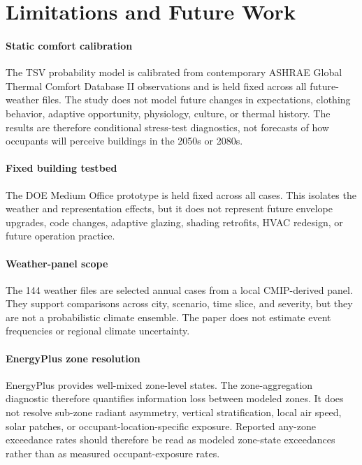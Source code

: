 \section{Limitations and Future Work}\label{sec:limitations}

\paragraph{Static comfort calibration}
The TSV probability model is calibrated from contemporary ASHRAE Global Thermal Comfort Database II observations and is held fixed across all future-weather files. The study does not model future changes in expectations, clothing behavior, adaptive opportunity, physiology, culture, or thermal history. The results are therefore conditional stress-test diagnostics, not forecasts of how occupants will perceive buildings in the 2050s or 2080s.

\paragraph{Fixed building testbed}
The DOE Medium Office prototype is held fixed across all cases. This isolates the weather and representation effects, but it does not represent future envelope upgrades, code changes, adaptive glazing, shading retrofits, HVAC redesign, or future operation practice.

\paragraph{Weather-panel scope}
The 144 weather files are selected annual cases from a local CMIP-derived panel. They support comparisons across city, scenario, time slice, and severity, but they are not a probabilistic climate ensemble. The paper does not estimate event frequencies or regional climate uncertainty.

\paragraph{EnergyPlus zone resolution}
EnergyPlus provides well-mixed zone-level states. The zone-aggregation diagnostic therefore quantifies information loss between modeled zones. It does not resolve sub-zone radiant asymmetry, vertical stratification, local air speed, solar patches, or occupant-location-specific exposure. Reported any-zone exceedance rates should therefore be read as modeled zone-state exceedances rather than as measured occupant-exposure rates.

